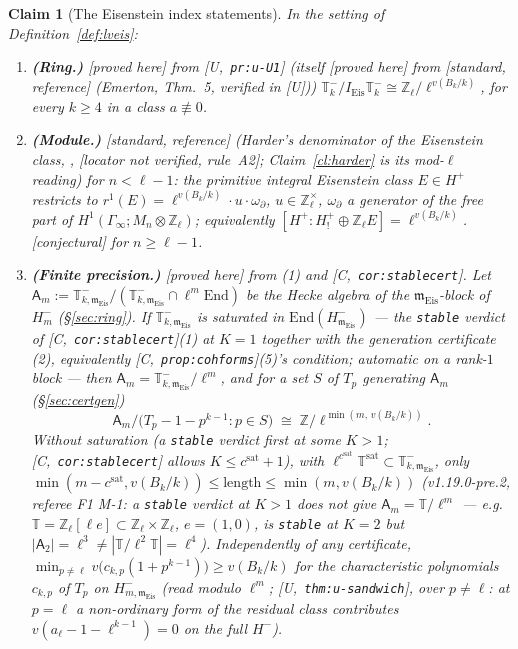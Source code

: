 \documentclass[11pt]{article}
\newtheorem{claim}[theorem]{Claim}
\theoremstyle{remark}
\newcommand{\Z}{\mathbb{Z}}
\newcommand{\Ga}{\Gamma}
\newcommand{\T}{\mathbb{T}}
\newcommand{\m}{\mathfrak{m}}
\newcommand{\Mn}{M_n}
\newcommand{\HA}[1]{[C,~\texttt{#1}]}      %
\newcommand{\PROVED}{\textsf{[proved here]}}
\newcommand{\STD}{\textsf{[standard, reference]}}
\newcommand{\CONJ}{\textsf{[conjectural]}}
\newcommand{\VERIFYloc}{\textsf{[locator not verified, rule~A2]}} %
\newcommand{\Ucite}[1]{[U,~\texttt{#1}]}               %
\begin{document}
\begin{claim}[The Eisenstein index statements]\label{cl:lveis}
In the setting of Definition~\ref{def:lveis}:
\begin{enumerate}
\item \textbf{(Ring.)} \PROVED{} from \Ucite{pr:u-U1} (itself \PROVED{} from \STD{} (Emerton, Thm.~5, verified in [U])) $\T^{-}_k/I_{\mathrm{Eis}}\T^{-}_k\cong\Z_\ell/\ell^{v(B_k/k)}$, for
  every $k\ge4$ in a class $a\not\equiv0$.
\item \textbf{(Module.)} \STD{} (Harder's denominator of the Eisenstein class, \cite{harder3}, \VERIFYloc; Claim~\ref{cl:harder} is its mod-$\ell$
  reading) for $n<\ell-1$: the primitive integral Eisenstein class $E\in H^{+}$ restricts to $r^{1}(E)=\ell^{v(B_k/k)}\cdot u\cdot\omega_\partial$, $u\in\Z_\ell^{\times}$,
  $\omega_\partial$ a generator of the free part of $H^{1}(\Ga_\infty;\Mn\otimes\Z_\ell)$; equivalently $[H^{+}:H^{+}_{!}\oplus\Z_\ell E]=\ell^{v(B_k/k)}$. \CONJ{} for $n\ge\ell-1$.
\item \textbf{(Finite precision.)} \PROVED{} from (1) and \HA{cor:stablecert}. Let $\mathsf A_m:=\T^{-}_{k,\m_{\mathrm{Eis}}}/(\T^{-}_{k,\m_{\mathrm{Eis}}}\cap\ell^{m}\mathrm{End})$ be the Hecke
  algebra of the $\m_{\mathrm{Eis}}$-block of $H^{-}_m$ (\S\ref{sec:ring}). If $\T^{-}_{k,\m_{\mathrm{Eis}}}$ is \emph{saturated} in $\mathrm{End}(H^{-}_{\m_{\mathrm{Eis}}})$ --- the
  \texttt{stable} verdict of \HA{cor:stablecert}(1) \emph{at $K=1$} together with the generation certificate (2), equivalently \HA{prop:cohforms}(5)'s condition; automatic on a
  rank-$1$ block --- then $\mathsf A_m=\T^{-}_{k,\m_{\mathrm{Eis}}}/\ell^{m}$, and for a set $S$ of $T_p$ generating $\mathsf A_m$ (\S\ref{sec:certgen})
  \[
    \mathsf A_m\big/\bigl(T_p-1-p^{k-1}:p\in S\bigr)\;\cong\;\Z/\ell^{\min(m,\,v(B_k/k))}.
  \]
  Without saturation (a \texttt{stable} verdict first at some $K>1$; \HA{cor:stablecert} allows $K\le c^{\mathrm{sat}}+1$), with $\ell^{c^{\mathrm{sat}}}\T^{\mathrm{sat}}\subset\T^{-}_{k,\m_{\mathrm{Eis}}}$,
  only $\min(m-c^{\mathrm{sat}},v(B_k/k))\le\mathrm{length}\le\min(m,v(B_k/k))$ (v1.19.0-pre.2, referee F1 M-1: a \texttt{stable} verdict at $K>1$ does not give
  $\mathsf A_m=\T/\ell^{m}$ --- e.g.\ $\T=\Z_\ell[\ell e]\subset\Z_\ell\times\Z_\ell$, $e=(1,0)$, is \texttt{stable} at $K=2$ but $|\mathsf A_2|=\ell^{3}\neq|\T/\ell^{2}\T|=\ell^{4}$).
  Independently of any certificate, $\min_{p\neq\ell}v\bigl(c_{k,p}(1+p^{k-1})\bigr)\ge v(B_k/k)$ for the characteristic polynomials $c_{k,p}$ of $T_p$ on
  $H^{-}_{m,\m_{\mathrm{Eis}}}$ (read modulo $\ell^{m}$; \Ucite{thm:u-sandwich}, over $p\neq\ell$: at $p=\ell$ a non-ordinary form of the residual class contributes
  $v(a_\ell-1-\ell^{k-1})=0$ on the full $H^{-}$).
\end{enumerate}
\end{claim}
\end{document}
